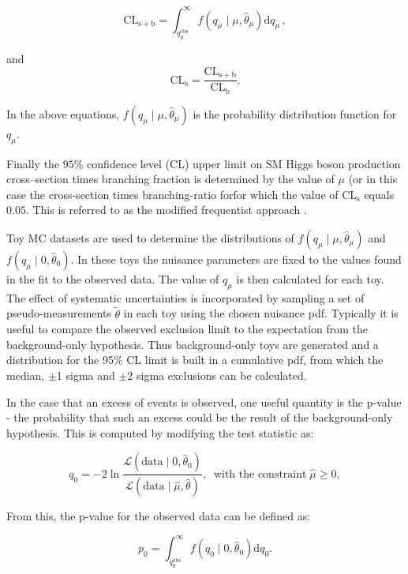 \begin{equation} \label{eqn:cl_splusb}
\mathrm{CL_{s+b}} =
\int_{q_{\mu}^{\mathrm{obs}}}^{\infty}f(q_{\mu}\mid\mu,\hat{\theta}_{\mu})\mathrm{d}q_{\mu}\,
,
\end{equation}

and 
\begin{equation}
\mathrm{CL_{s}} = \frac{\mathrm{CL_{s+b}}}{\mathrm{CL_{b}}}.
\end{equation}

In the above equations, $f(q_{\mu}\mid\mu,\hat{\theta}_{\mu})$ is the
probability distribution function for $q_{\mu}$. 

Finally the $95\%$ confidence level (CL) upper limit on \ac{SM} Higgs boson production
cross--section times branching fraction is determined by the value of $\mu$ (or
in this case the cross-section times branching-ratio forfor which the value of 
$\mathrm{CL_{s}}$ equals $0.05$. This is referred to as the modified frequentist approach
\cite{Read2}.

Toy \ac{MC} datasets are used to determine the distributions of 
$f(q_{\mu}\mid\mu,\hat{\theta}_{\mu})$ and $f(q_{\mu}\mid0,\hat{\theta}_{0})$.
In these toys the nuisance parameters are
fixed to the values found in the fit to the observed data. The value of
$q_{\mu}$ is then calculated for each toy. The effect of systematic
uncertainties is incorporated by sampling a set of pseudo-measurements
$\tilde{\theta}$ in each toy using the chosen nuisance \ac{pdf}.
Typically it is useful to compare the observed exclusion limit to the expectation 
from the background-only hypothesis. Thus background-only toys are generated and
a distribution for the 95\% CL limit is built in a cumulative \ac{pdf}, from
which the median, $\pm$1 sigma and $\pm$2 sigma exclusions can be calculated.

In the case that an excess of events is observed, one useful quantity is the
p-value - the probability that such an excess could be the result of the
background-only hypothesis. This is computed by modifying the test statistic as:

\begin{equation}
q_{0} = -2
\ln\frac{\mathcal{L}(\mathrm{data}\mid0,\hat{\theta}_{0})}{\mathcal{L}(\mathrm{data}\mid\hat{\mu},\hat{\theta})},
\;\; \text{with the constraint} \; \hat{\mu}\geq 0,
\end{equation}

From this, the p-value for the observed data can be defined as:

\begin{equation}
p_{0} =
\int_{q_{0}^{\mathrm{obs}}}^{\infty}f(q_{0}\mid0,\hat{\theta}_{0})\mathrm{d}q_{0}
.
\end{equation}

